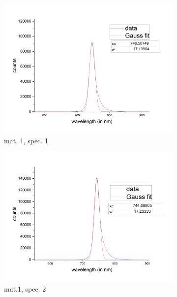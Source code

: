 \begin{figure}[H]
    \centering
    \begin{subfigure}{0.51\textwidth}
        \centering
        \includegraphics[width=\textwidth]{img/output_t1/spekt_m1-3}
        \caption{mat. 1, spec. 1}
	      \label{fig_mono_spec1_1dspec}
    \end{subfigure}
    \begin{subfigure}{0.51\textwidth}
        \centering
        \includegraphics[width=\textwidth]{img/output_t1/spekt_m1-2-1}
        \caption{mat.1, spec. 2}
	      \label{fig_mono_spec2_1dspec}
    \end{subfigure}
    \begin{subfigure}{0.51\textwidth}

\end{subfigure}
\end{figure}
